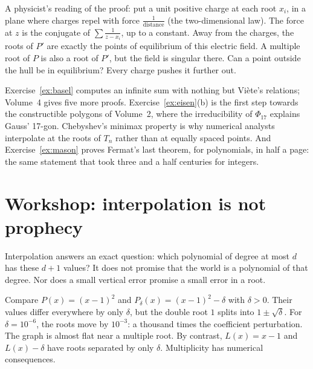 \begin{think}
A physicist's reading of the proof: put a unit positive charge at each root $x_i$, in a plane where charges repel with force $\frac1{\text{distance}}$ (the two-dimensional law). The force at $z$ is the conjugate of $\sum\frac1{z-x_i}$, up to a constant. Away from the charges, the roots of $P'$ are exactly the points of equilibrium of this electric field. A multiple root of $P$ is also a root of $P'$, but the field is singular there. Can a point outside the hull be in equilibrium? Every charge pushes it further out.
\end{think}

\begin{beauty}
Exercise~\ref{ex:basel} computes an infinite sum with nothing but Vi\`ete's relations; Volume~4 gives five more proofs.
Exercise~\ref{ex:eisen}(b) is the first step towards the constructible polygons of Volume~2, where the irreducibility of
$\Phi_{17}$ explains Gauss' 17-gon. Chebyshev's minimax property is why numerical analysts interpolate at the roots of
$T_n$ rather than at equally spaced points. And Exercise~\ref{ex:mason} proves Fermat's last theorem, for polynomials,
in half a page: the same statement that took three and a half centuries for integers.
\end{beauty}


\section{Workshop: interpolation is not prophecy}
Interpolation answers an exact question: which polynomial of degree at most $d$ has these $d+1$ values? It does not promise that the world is a polynomial of that degree. Nor does a small vertical error promise a small error in a root.

\begin{examplex}
Compare $P(x)=(x-1)^2$ and $P_\delta(x)=(x-1)^2-\delta$ with $\delta>0$. Their values differ everywhere by only $\delta$, but the double root $1$ splits into $1\pm\sqrt\delta$. For $\delta=10^{-6}$, the roots move by $10^{-3}$: a thousand times the coefficient perturbation. The graph is almost flat near a multiple root. By contrast, $L(x)=x-1$ and $L(x)-\delta$ have roots separated by only $\delta$. Multiplicity has numerical consequences.
\end{examplex}

